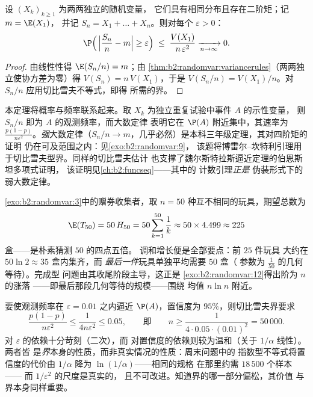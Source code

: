 \begin{theorem}[弱大数定律]\label{thm:b2:randomvar:lln}
设 $(X_k)_{k \geq 1}$ 为两两独立的随机变量，
它们具有相同分布且存在二阶矩；记 $m = \E(X_1)$，
并记 $S_n = X_1 + \dots + X_n$。则对每个 $\varepsilon > 0$：
\[
\P\Bigl(\,\Bigl|\frac{S_n}{n} - m\Bigr| \geq \varepsilon\Bigr)
\;\leq\; \frac{V(X_1)}{n\,\varepsilon^2}
\xrightarrow[n \to \infty]{} 0 .
\]
\end{theorem}

\begin{proof}
由线性性得 $\E(S_n/n) = m$；由
\cref{thm:b2:randomvar:variancerules}（两两独立使协方差为零）得
$V(S_n) = n\,V(X_1)$，于是 $V(S_n/n) =
V(X_1)/n$。对 $S_n/n$ 应用切比雪夫不等式，即得
所需的界。
\end{proof}

\begin{remark}
本定理将概率与频率联系起来。取
$X_k$ 为独立重复试验中事件 $A$ 的示性变量，
则 $S_n/n$ 即为 $A$ 的观测频率，而大数定律
表明它在 $\P(A)$ 附近集中，其速率为
$\frac{p(1-p)}{n\varepsilon^2}$。\emph{强}大数定律（$S_n/n \to
m$，几乎必然）是本科三年级定理，其对四阶矩的证明
仍在可及范围之内：见\cref{exo:b2:randomvar:9}，
该题将博雷尔–坎特利引理用于切比雪夫型界。同样的切比雪夫估计
也支撑了魏尔斯特拉斯逼近定理的伯恩斯坦多项式证明，
该证明见\cref{ch:b2:funcseq}——其中的
计数引理\emph{正是}
伪装形式下的弱大数定律。
\end{remark}

\begin{example}[收集五十张赠券]
\label{ex:b2:randomvar:couponnumeric}
\cref{exo:b2:randomvar:3}中的赠券收集者，取 $n =
50$ 种互不相同的玩具，期望总数为
\[
\E(T_{50}) = 50\,H_{50} = 50\sum_{k=1}^{50}\frac1k
\approx 50 \times 4.499 \approx 225
\]
盒——是朴素猜测 $50$ 的四点五倍。
调和增长便是全部要点：前 $25$ 件玩具
大约在 $50\ln2 \approx 35$ 盒内集齐，而
\emph{最后一件}玩具单独平均需要 $50$ 盒（
参数为 $\frac1{50}$ 的几何等待）。完成型
问题由其收尾阶段主导，这正是
\cref{exo:b2:randomvar:12}得出阶为 $n$ 的涨落
——即最后那段几何等待的规模——围绕
均值 $n\ln n$ 附近。
\end{example}

\begin{example}[$n$ 至少要多大？]\label{ex:b2:randomvar:llnnumeric}
要使观测频率在 $\varepsilon = 0.01$ 之内逼近
$\P(A)$，置信度为 $95\%$，则切比雪夫界要求
\[
\frac{p(1-p)}{n\varepsilon^2} \leq \frac{1}{4n\varepsilon^2}
\leq 0.05,
\qquad\text{即}\qquad
n \geq \frac{1}{4\cdot0.05\cdot(0.01)^2} = 50\,000 .
\]
对 $\varepsilon$ 的依赖十分苛刻（二次），而
对置信度的依赖则较为温和（关于 $1/\alpha$ 线性）。两者皆
是\emph{界}本身的性质，而非真实情况的性质：周末问题中的
指数型不等式将置信度的代价由
$1/\alpha$ 降为 $\ln(1/\alpha)$——相同的规格
在那里约需 $18\,500$ 个样本——
而 $1/\varepsilon^2$ 的尺度是真实的，
且不可改进。知道界的哪一部分偏松，其价值
与界本身同样重要。
\end{example}

